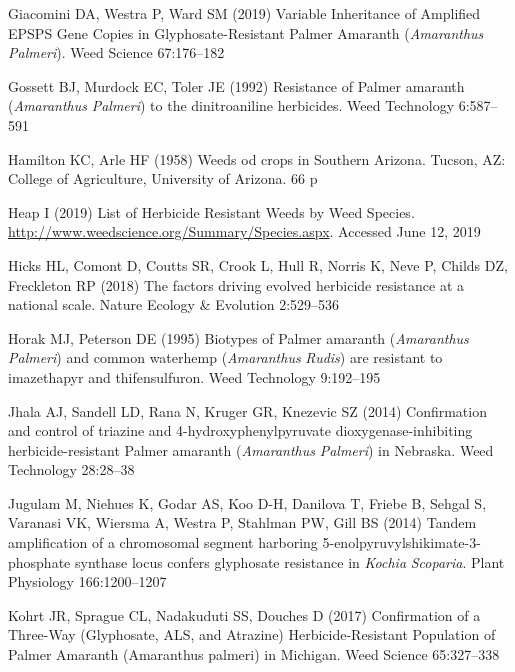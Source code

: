 \documentclass[
  12pt,
  a4paper]{article}
\begin{document}
\leavevmode\hypertarget{ref-giacomini_variable_2019}{}%
Giacomini DA, Westra P, Ward SM (2019) Variable Inheritance of Amplified
EPSPS Gene Copies in Glyphosate-Resistant Palmer Amaranth
(\emph{Amaranthus} \emph{Palmeri}). Weed Science 67:176--182

\leavevmode\hypertarget{ref-gossett_resistance_1992}{}%
Gossett BJ, Murdock EC, Toler JE (1992) Resistance of Palmer amaranth
(\emph{Amaranthus} \emph{Palmeri}) to the dinitroaniline herbicides.
Weed Technology 6:587--591

\leavevmode\hypertarget{ref-hamilton_weeds_1958}{}%
Hamilton KC, Arle HF (1958) Weeds od crops in Southern Arizona. Tucson,
AZ: College of Agriculture, University of Arizona. 66 p

\leavevmode\hypertarget{ref-heap_list_2019-1}{}%
Heap I (2019) List of Herbicide Resistant Weeds by Weed Species.
\url{http://www.weedscience.org/Summary/Species.aspx}. Accessed June 12,
2019

\leavevmode\hypertarget{ref-hicks_factors_2018}{}%
Hicks HL, Comont D, Coutts SR, Crook L, Hull R, Norris K, Neve P, Childs
DZ, Freckleton RP (2018) The factors driving evolved herbicide
resistance at a national scale. Nature Ecology \& Evolution 2:529--536

\leavevmode\hypertarget{ref-horak_biotypes_1995}{}%
Horak MJ, Peterson DE (1995) Biotypes of Palmer amaranth
(\emph{Amaranthus} \emph{Palmeri}) and common waterhemp
(\emph{Amaranthus} \emph{Rudis}) are resistant to imazethapyr and
thifensulfuron. Weed Technology 9:192--195

\leavevmode\hypertarget{ref-jhala_confirmation_2014}{}%
Jhala AJ, Sandell LD, Rana N, Kruger GR, Knezevic SZ (2014) Confirmation
and control of triazine and 4-hydroxyphenylpyruvate
dioxygenase-inhibiting herbicide-resistant Palmer amaranth
(\emph{Amaranthus} \emph{Palmeri}) in Nebraska. Weed Technology
28:28--38

\leavevmode\hypertarget{ref-jugulam_tandem_2014}{}%
Jugulam M, Niehues K, Godar AS, Koo D-H, Danilova T, Friebe B, Sehgal S,
Varanasi VK, Wiersma A, Westra P, Stahlman PW, Gill BS (2014) Tandem
amplification of a chromosomal segment harboring
5-enolpyruvylshikimate-3-phosphate synthase locus confers glyphosate
resistance in \emph{Kochia} \emph{Scoparia}. Plant Physiology
166:1200--1207

\leavevmode\hypertarget{ref-kohrt_confirmation_2017}{}%
Kohrt JR, Sprague CL, Nadakuduti SS, Douches D (2017) Confirmation of a
Three-Way (Glyphosate, ALS, and Atrazine) Herbicide-Resistant Population
of Palmer Amaranth (Amaranthus palmeri) in Michigan. Weed Science
65:327--338
\end{document}
